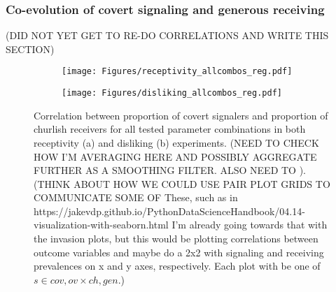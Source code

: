 \documentclass[11pt,letterpaper]{article}
\begin{document}


\subsubsection{Co-evolution of covert signaling and generous receiving}

(DID NOT YET GET TO RE-DO CORRELATIONS AND WRITE THIS SECTION)



\begin{figure}[H]
  \centering
  \begin{subfigure}{0.49\textwidth}
    \centering
    \texttt{[image: Figures/receptivity\_allcombos\_reg.pdf]}
    \caption{}
    \label{fig:}
  \end{subfigure}
  \begin{subfigure}{0.49\textwidth}
    \centering
    \texttt{[image: Figures/disliking\_allcombos\_reg.pdf]}
    \caption{}
    \label{fig:}
  \end{subfigure}
  \caption{Correlation between proportion of covert signalers and proportion of
    churlish receivers for all tested parameter combinations in both 
    receptivity (a) and disliking (b) experiments. (NEED TO CHECK HOW I'M AVERAGING
    HERE AND POSSIBLY AGGREGATE FURTHER AS A SMOOTHING FILTER. ALSO NEED TO
). (THINK ABOUT HOW WE COULD USE PAIR PLOT GRIDS TO COMMUNICATE SOME OF
These, such as in https://jakevdp.github.io/PythonDataScienceHandbook/04.14-visualization-with-seaborn.html
I'm already going towards that with the invasion plots, but this would be
plotting correlations between outcome variables and maybe do a 2x2 with
signaling and receiving prevalences on x and y axes, respectively. Each plot
with be one of $s \in {cov, ov} \times {ch, gen}$.)}
  
  \label{fig:regressions}
\end{figure}
\end{document}
